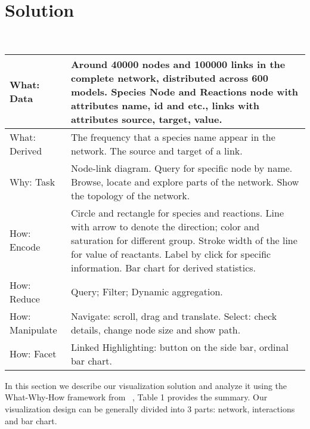 \documentclass[journal]{vgtc}                %
\begin{document}
\section{Solution}

\begin{table}[tb]

\\
\begin{tabular}{p{2cm}|p{5cm}}
\hline

    What: Data & Around 40000 nodes and 100000 links in the complete network, distributed across 600 models. Species Node and Reactions node with attributes name, id and etc., links with attributes source, target, value. \\
    \hline
    What: Derived& The frequency that a species name appear in the network. The source and target of a link.\\
    \hline
    Why: Task&Node-link diagram. Query for specific node by name. Browse, locate and explore parts of the network. Show the topology of the network.\\
    \hline
    How: Encode&Circle and rectangle for species and reactions. Line with arrow to denote the direction; color and saturation for different group. Stroke width of the line for value of reactants. Label by click for specific information. Bar chart for derived statistics. \\
    \hline
    How: Reduce&Query; Filter; Dynamic aggregation.\\
    \hline
    How: Manipulate&Navigate: scroll, drag and translate. Select: check details, change node size and show path. \\
    \hline
    How: Facet&Linked Highlighting: button on the side bar, ordinal bar chart.\\
    \hline
    
    
\end{tabular}
\end{table}



In this section we describe our visualization solution and analyze it using the What-Why-How framework from ~\cite{munzner2014visualization}, Table 1 provides the summary. Our visualization design can be generally divided into 3 parts: network, interactions and bar chart.
\end{document}
